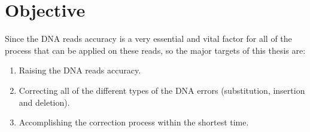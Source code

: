 \documentclass{llncs}
\begin{document}
\section{Objective}
Since the DNA reads accuracy is a very essential and vital factor for all of the process that can be applied on these reads, so the major targets of this thesis are:
\begin{enumerate}
   \item Raising the DNA reads accuracy.

   \item Correcting all of the different types of the DNA errors (substitution, insertion and deletion).

   \item Accomplishing the correction process within the shortest time.
\end{enumerate}
\end{document}
